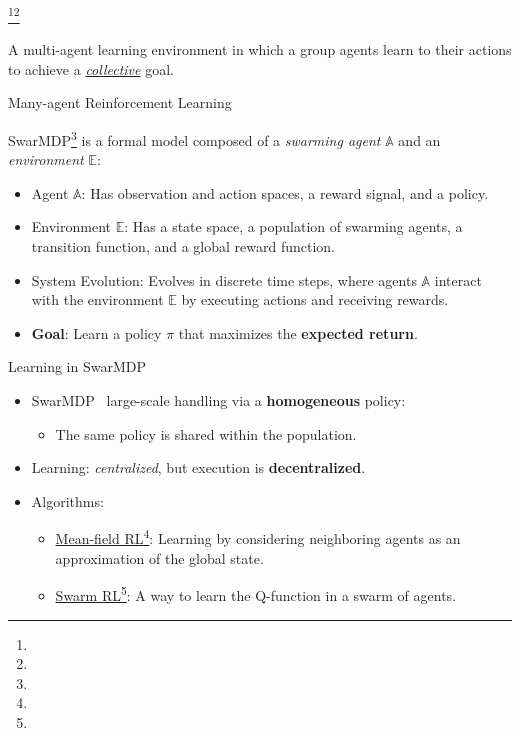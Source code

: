 \documentclass[presentation, 8pt,169]{beamer}\mode<presentation>{\usetheme{AMSBolognaFC}}
\begin{document}
\begin{frame}[plain]
  \begin{center}
\huge{\footnote{\tiny{}}}\footnote{\tiny{}}
  \end{center}
  \begin{center}
    \large{A multi-agent learning environment in which a  group agents learn to  their actions to achieve a \emph{\underline{collective}} goal}.
  \end{center}
\end{frame} 
\begin{frame}{Many-agent Reinforcement Learning}

SwarMDP\footnote{} is a formal model composed of a \emph{swarming agent} $\mathbb{A}$ and an \emph{environment} $\mathbb{E}$:
  \begin{itemize}
    \item Agent $\mathbb{A}$: Has observation and action spaces, a reward signal, and a policy.
    \item Environment $\mathbb{E}$: Has a state space, a population of swarming agents, a transition function, and a global reward function.
    \item System Evolution: Evolves in discrete time steps, where agents $\mathbb{A}$ interact with the environment $\mathbb{E}$ by executing actions and receiving rewards.
    \item \textbf{Goal}: Learn a policy $\pi$ that maximizes the \textbf{expected return}.
  \end{itemize}

\begin{block}{Learning in SwarMDP}
  \begin{itemize}
    \item SwarMDP \faArrowRight \, large-scale handling via a \textbf{homogeneous} policy:
      \begin{itemize}
        \item The same policy is shared within the population.
      \end{itemize}
    \item Learning: \emph{centralized}, but execution is \textbf{decentralized}.
    \item Algorithms:
      \begin{itemize}
        \item \underline{Mean-field RL}\footnote[frame]{}: Learning by considering neighboring agents as an approximation of the global state.
        \item \underline{Swarm RL}\footnote[frame]{}: A way to learn the Q-function in a swarm of agents.
      \end{itemize}
  \end{itemize}
\end{block}

\end{frame}
\end{document}
